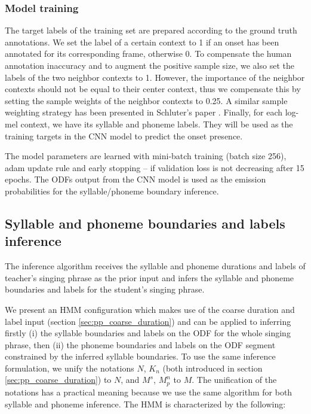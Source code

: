 \subsubsection{Model training}

The target labels of the training set are prepared according to the ground truth annotations. We set the label of a certain context to 1 if an onset has been annotated for its corresponding frame, otherwise 0. To compensate the human annotation inaccuracy and to augment the positive sample size, we also set the labels of the two neighbor contexts to 1. However, the importance of the neighbor contexts should not be equal to their center context, thus we compensate this by setting the sample weights of the neighbor contexts to 0.25. A similar sample weighting strategy has been presented in Schluter's paper \cite{Schluter2014}. Finally, for each log-mel context, we have its syllable and phoneme labels. They will be used as the training targets in the \gls{CNN} model to predict the onset presence.

The model parameters are learned with mini-batch training (batch size 256), adam \cite{kingma2014adam} update rule and early stopping -- if validation loss is not decreasing after 15 epochs. The \gls{ODF}s output from the \gls{CNN} model is used as the emission probabilities for the syllable/phoneme boundary inference.

\subsection{Syllable and phoneme boundaries and labels inference}\label{sec:ch5:dur_label}

The inference algorithm receives the syllable and phoneme durations and labels of teacher's singing phrase as the prior input and infers the syllable and phoneme boundaries and labels for the student's singing phrase.

We present an \gls{HMM} configuration which makes use of the coarse duration and label input (section \ref{sec:pp_coarse_duration}) and can be applied to inferring firstly (i) the syllable boundaries and labels on the \gls{ODF} for the whole singing phrase, then (ii) the phoneme boundaries and labels on the \gls{ODF} segment constrained by the inferred syllable boundaries. To use the same inference formulation, we unify the notations $N$, $K_n$ (both introduced in section \ref{sec:pp_coarse_duration}) to $N$, and $M^s$, $M^{n}_{p}$ to $M$. The unification of the notations has a practical meaning because we use the same algorithm for both syllable and phoneme inference. The \gls{HMM} is characterized by the following:

